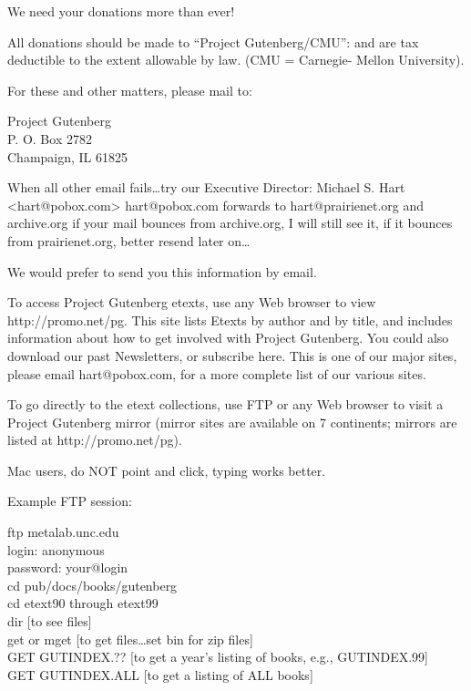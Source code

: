 \documentclass[12pt]{book}
\begin{document}
We need your donations more than ever!


All donations should be made to ``Project Gutenberg/CMU'': and are
tax deductible to the extent allowable by law.  (CMU = Carnegie-
Mellon University).

For these and other matters, please mail to:

\begin{center}
Project Gutenberg \\
P. O. Box  2782 \\
Champaign, IL 61825
\end{center}

When all other email fails\ldots try our Executive Director:
Michael S. Hart <hart@pobox.com>
hart@pobox.com forwards to hart@prairienet.org and \newline archive.org
if your mail bounces from archive.org, I will still see it, if
it bounces from prairienet.org, better resend later on\ldots

We would prefer to send you this information by email.

\newpage

To access Project Gutenberg etexts, use any Web browser
to view \newline http://promo.net/pg.  This site lists Etexts by
author and by title, and includes information about how
to get involved with Project Gutenberg.  You could also
download our past Newsletters, or subscribe here.  This
is one of our major sites, please email hart@pobox.com,
for a more complete list of our various sites.

To go directly to the etext collections, use FTP or any
Web browser to visit a Project Gutenberg mirror (mirror
sites are available on 7 continents; mirrors are listed
at http://promo.net/pg).

Mac users, do NOT point and click, typing works better.

Example FTP session:

\noindent ftp metalab.unc.edu\\
login: anonymous\\
password: your@login\\
cd pub/docs/books/gutenberg\\
cd etext90 through etext99\\
dir [to see files]\\
get or mget [to get files\ldots set bin for zip files]\\
GET GUTINDEX.??  [to get a year's listing of books, e.g., GUTINDEX.99]\\
GET GUTINDEX.ALL [to get a listing of ALL books]\\
\end{document}
